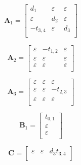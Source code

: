 \documentclass[11pt, a4paper, fleqn]{article}
\begin{document}
\begin{equation*}
\mathbf{A}_{1} = 
\left[\begin{array}{ ccc }
d_1	&\varepsilon	&\varepsilon\\
\varepsilon	&d_2	&\varepsilon\\
-t_{3,4}	&\varepsilon	&d_3\\
\end{array}\right]
\end{equation*}

\begin{equation*}
\mathbf{A}_{2} = 
\left[\begin{array}{ ccc }
\varepsilon	&-t_{1,2}	&\varepsilon\\
\varepsilon	&\varepsilon	&\varepsilon\\
\varepsilon	&\varepsilon	&\varepsilon\\
\end{array}\right]
\end{equation*}

\begin{equation*}
\mathbf{A}_{3} = 
\left[\begin{array}{ ccc }
\varepsilon	&\varepsilon	&\varepsilon\\
\varepsilon	&\varepsilon	&-t_{2,3}\\
\varepsilon	&\varepsilon	&\varepsilon\\
\end{array}\right]
\end{equation*}

\begin{equation*}
\mathbf{B}_{1} = 
\left[\begin{array}{ c }
t_{0,1}\\
\varepsilon\\
\varepsilon\\
\end{array}\right]
\end{equation*}

\begin{equation*}
\mathbf{C}_{{}} = 
\left[\begin{array}{ ccc }
\varepsilon	&\varepsilon	&d_3t_{3,4}\\
\end{array}\right]
\end{equation*}
\end{document}
